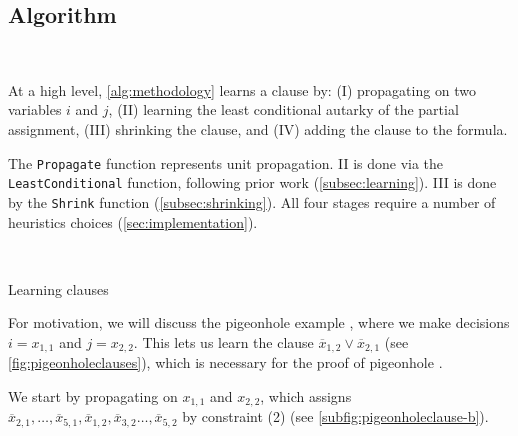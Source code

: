 \subsection{Algorithm}~\label{subsec:methodology}


At a high level, \autoref{alg:methodology} learns a \pr clause by: (I)
propagating on two variables $i$ and $j$, (II) learning the least conditional
autarky of the partial assignment, (III) shrinking the clause, and (IV) adding
the clause to the formula. 

The \texttt{Propagate} function represents unit propagation. II is done via the
\texttt{LeastConditional} function, following prior work
(\autoref{subsec:learning}). III is done by the \texttt{Shrink} function
(\autoref{subsec:shrinking}). All four stages require a number of heuristics
choices (\autoref{sec:implementation}).

\begin{algorithm}~\label{alg:methodology}
    \caption{Learning \pr clauses}\label{alg:methodology}
    \SetAlgoNoLine
\end{algorithm}

For motivation, we will discuss the pigeonhole example , where we make
decisions $i = x_{1, 1}$ and $j = x_{2, 2}$. This lets us learn the clause
$\overline{x}_{1, 2} \lor \overline{x}_{2, 1}$ (see
\autoref{fig:pigeonholeclauses}), which is necessary for the \pr proof of
pigeonhole \cite{prclauses}. 


We start by propagating on $x_{1, 1}$ and $x_{2, 2}$, which assigns
$\overline{x}_{2, 1}, \ldots, \overline{x}_{5, 1}, \overline{x}_{1, 2},
\overline{x}_{3, 2} \ldots, \overline{x}_{5, 2}$ by constraint (2) (see
\autoref{subfig:pigeonholeclause-b}).


